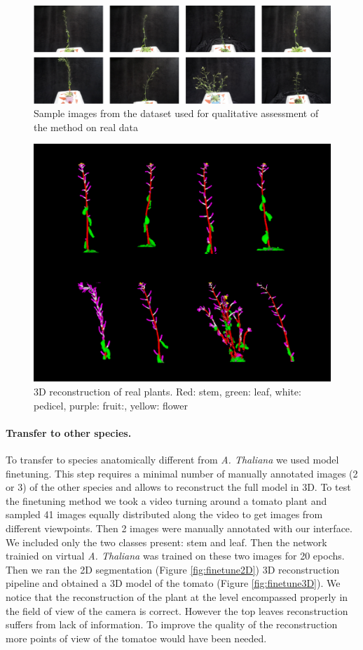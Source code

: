 \begin{figure}[h!]
    \centering \includegraphics[width = \linewidth]{figures/seg-crop.pdf}
    \caption{Sample images from the dataset used for qualitative assessment of the method on real data} \label{fig:realscans}
\end{figure}

\begin{figure}[h!]
    \centering \includegraphics[width = 0.7\linewidth]{figures/capture.png}
    \caption{3D reconstruction of real plants. Red: stem, green: leaf, white: pedicel, purple: fruit:, yellow: flower} \label{fig:rec3d}
\end{figure}

\paragraph{Transfer to other species.}
To transfer to species anatomically different from \emph{A. Thaliana} we used model finetuning. This step requires a minimal number of manually annotated images (2 or 3) of the other species and allows to reconstruct the full model in 3D. To test the finetuning method we took a video turning around a tomato plant and sampled 41 images equally distributed along the video to get images from different viewpoints. Then 2 images were manually annotated with our interface. We included only the two classes present: stem and leaf. Then the network trainied on virtual \emph{A. Thaliana} was trained on these two images for 20 epochs. Then we ran the 2D segmentation (Figure \ref{fig:finetune2D}) 3D reconstruction pipeline and obtained a 3D model of the tomato (Figure \ref{fig:finetune3D}). We notice that the reconstruction of the plant at the level encompassed properly in the field of view of the camera is correct. However the top leaves reconstruction suffers from lack of information. To improve the quality of the reconstruction more points of view of the tomatoe would have been needed. 

